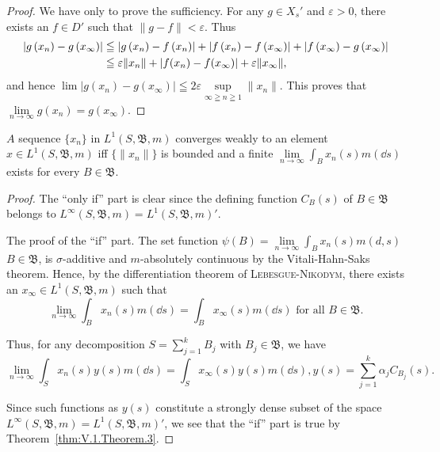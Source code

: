 \begin{proof}
 We have only to prove the sufficiency. For any $g \in X_s'$ and $\varepsilon > 0$, there exists an $f \in D'$ such that $\| g - f \| < \varepsilon$. Thus 
\begin{align}
\left| g \left(x _{n}\right) - g \left(x _{\infty}\right) \right|& \leqq \left| g \left(x _{n}\right) - f \left(x _{n}\right) \right| + \left| f \left(x _{n}\right) - f \left(x _{\infty}\right) \right| + \left| f \left(x _{\infty}\right) - g \left(x _{\infty}\right) \right| \notag \\
&\leqq \varepsilon \| x _{n} \| + | f (x _{n}) - f (x _{\infty}) | + \varepsilon \| x _{\infty} \|, \notag
\end{align}
and hence $\lim |g(x_n) - g(x_\infty)| \leqq 2\varepsilon \sup\limits_{\infty \geqq n \geqq 1} \|x_n\|$. This proves that $\lim\limits_{n \to \infty} g(x_n) = g(x_\infty)$. 
\end{proof}

\begin{theorem}\label{thm:V.1.Theorem.4} $A$ sequence $\{x_{n}\}$ in $L^{1}(S, \mathfrak{B}, m)$ converges weakly to an element $x \in L^{1}(S, \mathfrak{B}, m)$ iff $\{\| x_{n} \|\}$ is bounded and a finite $\lim\limits_{n \to \infty} \int_{B} x_{n}(s) m(\dd s)$ exists for every $B \in \mathfrak{B}$. 
\end{theorem}

\begin{proof}
 The ``only if'' part is clear since the defining function $C_{B}(s)$ of $B \in \mathfrak{B}$ belongs to $L^{\infty}(S, \mathfrak{B}, m) = L^{1}(S, \mathfrak{B}, m)'$. 

The proof of the ``if'' part. The set function $\psi(B)=\lim\limits_{n\to\infty}\int_{B}x_{n}(s)m(d,s)$ $B\in\mathfrak{B}$, is $\sigma$-additive and $m$-absolutely continuous by the Vitali-Hahn-Saks theorem. Hence, by the differentiation theorem of \textsc{Lebesgue}-\textsc{Nikodym}, there exists an $x_{\infty} \in L^{1}(S, \mathfrak{B}, m)$ such that 
\[
\lim\limits _{n \rightarrow \infty} \int_{B} x _{n} (s) m (\dd s) = \int_{B} x _{\infty} (s) m (\dd s) \text{ for all } B \in \mathfrak {B}.
\]

Thus, for any decomposition $S = \sum\limits_{j=1}^{k} B_j$ with $B_j \in \mathfrak{B}$, we have 
\[
\lim\limits _{n \rightarrow \infty} \int_{S} x _{n} (s) y (s) m (\dd s) = \int_{S} x _{\infty} (s) y (s) m (\dd s), y (s) = \sum\limits_{j=1} ^{k} \alpha_{j} C _ {B _{j}} (s).
\]

Since such functions as $y(s)$ constitute a strongly dense subset of the space $L^{\infty}(S, \mathfrak{B}, m) = L^{1}(S, \mathfrak{B}, m)'$, we see that the ``if'' part is true by Theorem~\ref{thm:V.1.Theorem.3}. 
\end{proof}

